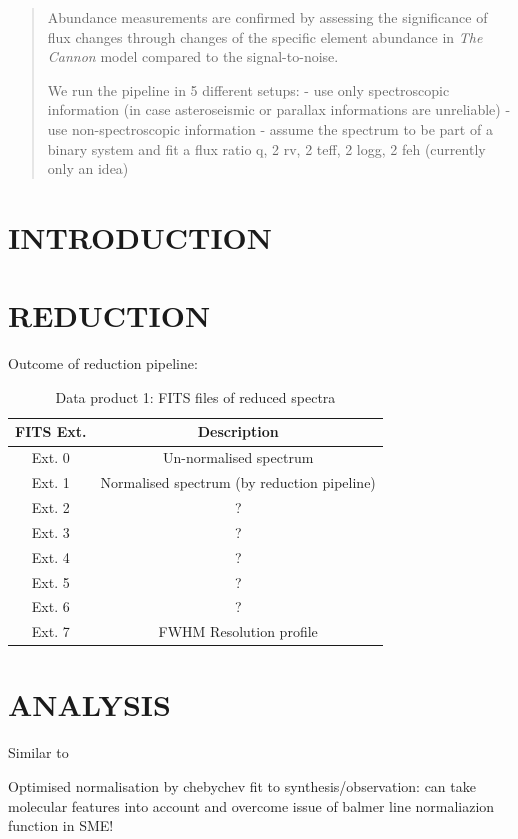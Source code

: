 \documentclass[
  journal=pasa,
  manuscript=research-paper, %
  year=2021,
  volume=37,
]{cup-journal}
\newcommand{\TheCannon}{\textit{The Cannon}\xspace}
\begin{document}
\begin{abstract}
Abundance measurements are confirmed by assessing the significance of flux changes through changes of the specific element abundance in \TheCannon model compared to the signal-to-noise.

We run the pipeline in 5 different setups:
- use only spectroscopic information (in case asteroseismic or parallax informations are unreliable)
- use non-spectroscopic information
- assume the spectrum to be part of a binary system and fit a flux ratio q, 2 rv, 2 teff, 2 logg, 2 feh (currently only an idea)
\end{abstract}

\section{INTRODUCTION}

\section{REDUCTION}

Outcome of reduction pipeline:
\begin{table}
    \centering
    \caption{Data product 1: FITS files of reduced spectra}
    \label{tab:reduction_fits}
    \begin{tabular}{c|c}
    \hline \hline
    FITS Ext. & Description \\
    \hline
    Ext. 0 & Un-normalised spectrum \\
    Ext. 1 & Normalised spectrum (by reduction pipeline) \\
    Ext. 2 & ? \\
    Ext. 3 & ? \\
    Ext. 4 & ? \\
    Ext. 5 & ? \\
    Ext. 6 & ? \\
    Ext. 7 & FWHM Resolution profile \\
    \hline
    \end{tabular}
\end{table}

\section{ANALYSIS}

Similar to \citet{Rix2016}

Optimised normalisation by chebychev fit to synthesis/observation: can take molecular features into account and overcome issue of balmer line normaliazion function in SME!
\end{document}

